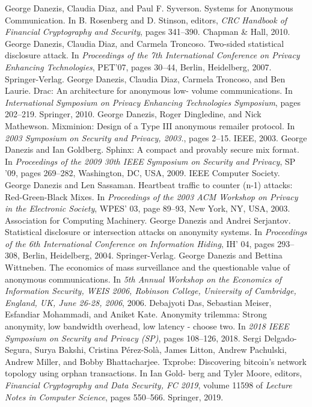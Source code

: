 \documentclass{article}
\begin{document}
\begin{thebibliography}{200}
George Danezis, Claudia Diaz, and Paul F. Syverson. Systems for Anonymous Communication. In B. Rosenberg and D. Stinson, editors, \emph{CRC Handbook of Financial Cryptography and Security}, pages 341–390. Chapman \& Hall, 2010.
George Danezis, Claudia Diaz, and Carmela Troncoso. Two-sided statistical disclosure attack. In \emph{Proceedings of the 7th International Conference on Privacy Enhancing Technologies}, PET’07, pages 30–44, Berlin, Heidelberg, 2007. Springer-Verlag.
George Danezis, Claudia Diaz, Carmela Troncoso, and Ben Laurie. Drac: An architecture for anonymous low- volume communications. In \emph{International Symposium on Privacy Enhancing Technologies Symposium}, pages 202–219. Springer, 2010.
George Danezis, Roger Dingledine, and Nick Mathewson. Mixminion: Design of a Type III anonymous remailer protocol. In \emph{2003 Symposium on Security and Privacy, 2003.}, pages 2–15. IEEE, 2003.
George Danezis and Ian Goldberg. Sphinx: A compact and provably secure mix format. In \emph{Proceedings of the 2009 30th IEEE Symposium on Security and Privacy}, SP ’09, pages 269–282, Washington, DC, USA, 2009. IEEE Computer Society.
George Danezis and Len Sassaman. Heartbeat traffic to counter (n-1) attacks: Red-Green-Black Mixes. In \emph{Proceedings of the 2003 ACM Workshop on Privacy in the Electronic Society}, WPES' 03, page 89–93, New York, NY, USA, 2003. Association for Computing Machinery.
George Danezis and Andrei Serjantov. Statistical disclosure or intersection attacks on anonymity systems. In \emph{Proceedings of the 6th International Conference on Information Hiding}, IH' 04, pages 293–308, Berlin, Heidelberg, 2004. Springer-Verlag.
George Danezis and Bettina Wittneben. The economics of mass surveillance and the questionable value of anonymous communications. In \emph{5th Annual Workshop on the Economics of Information Security, WEIS 2006, Robinson College, University of Cambridge, England, UK, June 26-28, 2006}, 2006.
Debajyoti Das, Sebastian Meiser, Esfandiar Mohammadi, and Aniket Kate. Anonymity trilemma: Strong anonymity, low bandwidth overhead, low latency - choose two. In \emph{2018 IEEE Symposium on Security and Privacy (SP)}, pages 108–126, 2018.
Sergi Delgado-Segura, Surya Bakshi, Cristina Pérez-Solà, James Litton, Andrew Pachulski, Andrew Miller, and Bobby Bhattacharjee. Txprobe: Discovering bitcoin’s network topology using orphan transactions. In Ian Gold- berg and Tyler Moore, editors, \emph{Financial Cryptography and Data Security, FC 2019}, volume 11598 of \emph{Lecture Notes in Computer Science}, pages 550–566. Springer, 2019.

\end{thebibliography}
\end{document}
